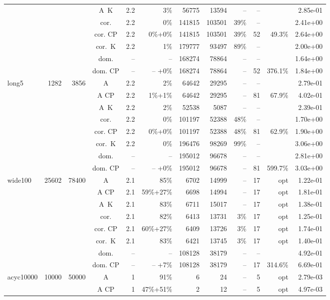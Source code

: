 \documentclass[11pt]{amsart}
\newenvironment{outdent}
{\begin{list}{}{\leftmargin-2cm\rightmargin\leftmargin}\centering\item\relax}
{\end{list}\ignorespacesafterend}
\theoremstyle{plain}
\theoremstyle{remark}
\begin{document}
\begin{table}
\begin{outdent}
\begin{footnotesize}
\begin{tabular}{|l|rrc|rr|rrr|rr|r|}
&&&A~K & 2.2 & 3\% &56775 & 13594 & -- & -- & & 2.85e-01 \\
&&&cor. & 2.2 & 0\% &141815 & 103501 & 39\% & -- & & 2.41e+00 \\
&&&cor. CP & 2.2 & 0\%+0\% &141815 & 103501 & 39\% &52 & 49.3\% & 2.64e+00 \\
&&&cor.~K & 2.2 & 1\% &179777 & 93497 & 89\% & -- & & 2.00e+00 \\
&&&dom. & -- & --  &168274 & 78864 & -- & -- & & 1.64e+00 \\
&&&dom. CP & -- & -- +0\% &168274 & 78864 & -- &52 & 376.1\% & 1.84e+00 \\
\hline
long5 & 1282 & 3856 & A & 2.2 & 2\% &64642 & 29295 & -- & -- & & 2.79e-01 \\
&&&A CP & 2.2 & 1\%+1\% &64642 & 29295 & -- &81 & 67.9\% & 4.02e-01 \\
&&&A~K & 2.2 & 2\% &52538 & 5087 & -- & -- & & 2.39e-01 \\
&&&cor. & 2.2 & 0\% &101197 & 52388 & 48\% & -- & & 1.70e+00 \\
&&&cor. CP & 2.2 & 0\%+0\% &101197 & 52388 & 48\% &81 & 62.9\% & 1.90e+00 \\
&&&cor.~K & 2.2 & 0\% &196476 & 98269 & 99\% & -- & & 3.06e+00 \\
&&&dom. & -- & --  &195012 & 96678 & -- & -- & & 2.81e+00 \\
&&&dom. CP & -- & -- +0\% &195012 & 96678 & -- &81 & 599.7\% & 3.03e+00 \\
\hline
wide100 & 25602 & 78400 & A & 2.1 & 85\% &6702 & 14999 & -- &17 & opt & 1.22e-01 \\
&&&A CP & 2.1 & 59\%+27\% &6698 & 14994 & -- &17 & opt & 1.81e-01 \\
&&&A~K & 2.1 & 83\% &6711 & 15017 & -- &17 & opt & 1.38e-01 \\
&&&cor. & 2.1 & 82\% &6413 & 13731 & 3\% &17 & opt & 1.25e-01 \\
&&&cor. CP & 2.1 & 60\%+27\% &6409 & 13726 & 3\% &17 & opt & 1.74e-01 \\
&&&cor.~K & 2.1 & 83\% &6421 & 13745 & 3\% &17 & opt & 1.40e-01 \\
&&&dom. & -- & --  &108128 & 38179 & -- & -- & & 4.92e-01 \\
&&&dom. CP & -- & -- +7\% &108128 & 38179 & -- &17 & 314.6\% & 6.69e-01 \\
\hline
acyc10000 & 10000 & 50000 & A & 1 & 91\% &6 & 24 & -- &5 & opt & 2.79e-03 \\
&&&A CP & 1 & 47\%+51\% &2 & 12 & -- &5 & opt & 4.97e-03 \\

\end{tabular}
\end{footnotesize}
\end{outdent}
\end{table}
\end{document}
